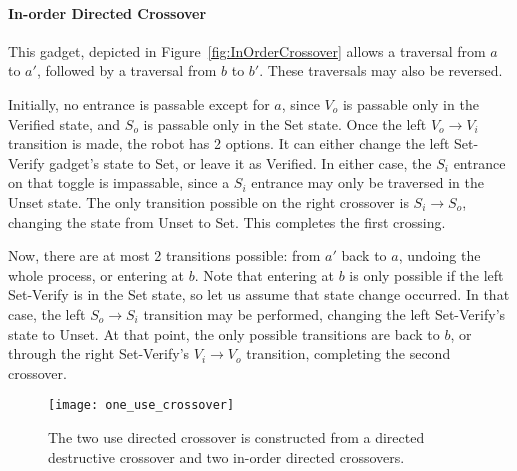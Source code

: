 


\paragraph{In-order Directed Crossover} This gadget, depicted in Figure~\ref{fig:InOrderCrossover} allows a traversal from $a$ to $a'$, followed by a traversal from $b$ to $b'$. These traversals may also be reversed.

Initially, no entrance is passable except for $a$, since $V_o$ is passable only in the Verified state, and $S_o$ is
passable only in the Set state. Once the left $V_o \rightarrow V_i$ transition is made, the robot has 2 options.
It can either change the left Set-Verify gadget's state to Set, or leave it as Verified. In either case, the $S_i$
entrance on that toggle is impassable, since a $S_i$ entrance may only be traversed in the Unset state. The
only transition possible on the right crossover is $S_i \rightarrow S_o$, changing the state from Unset to Set.
This completes the first crossing.

Now, there are at most 2 transitions possible: from $a'$ back to $a$, undoing the whole process, or entering at $b$. Note that entering at $b$ is only possible if the left Set-Verify is in the Set state, so let us assume that state change occurred. In that case, the left $S_o \rightarrow S_i$ transition may be performed, changing the left Set-Verify's state to Unset. At that point, the only possible transitions are back to $b$, or through the right Set-Verify's
$V_i \rightarrow V_o$ transition, completing the second crossover.

\begin{wrapfigure}{hr}{0.45\textwidth}
\vspace{-5mm}
  \centering
    \texttt{[image: one\_use\_crossover]}
    \caption{The two use directed crossover is constructed from a directed destructive crossover and two in-order directed crossovers.}
    \label{fig:OneUseCrossover}
    \vspace{-7mm}
\end{wrapfigure}

